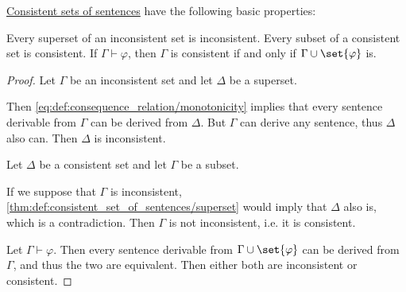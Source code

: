 \begin{proposition}\label{thm:def:consistent_set_of_sentences}
  \hyperref[def:consistent_set_of_sentences]{Consistent sets of sentences} have the following basic properties:
  \begin{thmenum}
     Every superset of an inconsistent set is inconsistent.
     Every subset of a consistent set is consistent.
     If \( \Gamma \vdash \varphi \), then \( \Gamma \) is consistent if and only if \( \Gamma \cup \set{ \varphi } \) is.
  \end{thmenum}
\end{proposition}
\begin{proof}
   Let \( \Gamma \) be an inconsistent set and let \( \Delta \) be a superset.

  Then \eqref{eq:def:consequence_relation/monotonicity} implies that every sentence derivable from \( \Gamma \) can be derived from \( \Delta \). But \( \Gamma \) can derive any sentence, thus \( \Delta \) also can. Then \( \Delta \) is inconsistent.

   Let \( \Delta \) be a consistent set and let \( \Gamma \) be a subset.

  If we suppose that \( \Gamma \) is inconsistent, \cref{thm:def:consistent_set_of_sentences/superset} would imply that \( \Delta \) also is, which is a contradiction. Then \( \Gamma \) is not inconsistent, i.e. it is consistent.

   Let \( \Gamma \vdash \varphi \). Then every sentence derivable from \( \Gamma \cup \set{ \varphi } \) can be derived from \( \Gamma \), and thus the two are equivalent. Then either both are inconsistent or consistent.
\end{proof}

